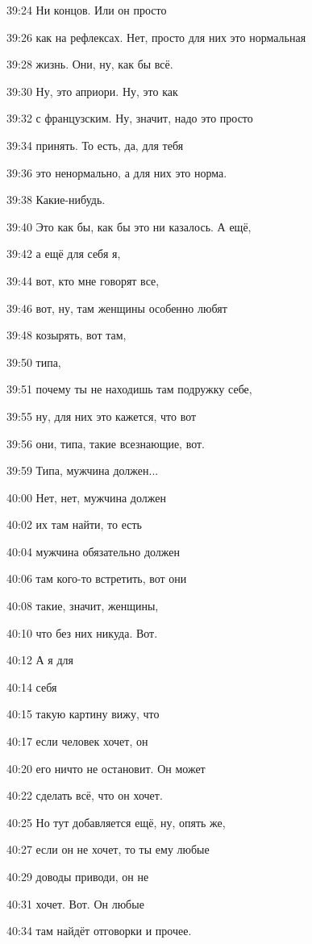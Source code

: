 39:24
Ни концов. Или он просто

39:26
как на рефлексах. Нет, просто для них это нормальная

39:28
жизнь. Они, ну, как бы всё.

39:30
Ну, это априори. Ну, это как

39:32
с французским. Ну, значит, надо это просто

39:34
принять. То есть, да, для тебя

39:36
это ненормально, а для них это норма.

39:38
Какие-нибудь.

39:40
Это как бы, как бы это ни казалось. А ещё,

39:42
а ещё для себя я,

39:44
вот, кто мне говорят все,

39:46
вот, ну, там женщины особенно любят

39:48
козырять, вот там,

39:50
типа,

39:51
почему ты не находишь там подружку себе,

39:55
ну, для них это кажется, что вот

39:56
они, типа, такие всезнающие, вот.

39:59
Типа, мужчина должен...

40:00
Нет, нет, мужчина должен

40:02
их там найти, то есть

40:04
мужчина обязательно должен

40:06
там кого-то встретить, вот они

40:08
такие, значит, женщины,

40:10
что без них никуда. Вот.

40:12
А я для

40:14
себя

40:15
такую картину вижу, что

40:17
если человек хочет, он

40:20
его ничто не остановит. Он может

40:22
сделать всё, что он хочет.

40:25
Но тут добавляется ещё, ну, опять же,

40:27
если он не хочет, то ты ему любые

40:29
доводы приводи, он не

40:31
хочет. Вот. Он любые

40:34
там найдёт отговорки и прочее.

